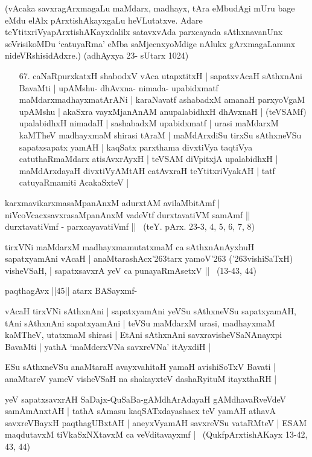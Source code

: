 (vAcaka savxragArxmagaLu maMdarx, madhayx, tAra eMbudAgi mUru bage eMdu elAlx pArxtishAkayxgaLu heVLutatxve. Adare teYtitxriVyapArxtishAKayxdalilx satavxvAda parxcayada sAthxnavanUnx seVrisikoMDu `catuyaRma' eMba saMjecnxyoMdige nAlukx gArxmagaLanunx nideVRshisidAdxre.) (adhAyxya 23- sUtarx 1024)

\begin{itemize}
\item[67.] caNaRpurxkatxH shabodxV vAca utapxtitxH | sapatxvAcaH sAthxnAni BavaMti |
upAMshu- dhAvxna- nimada- upabidxmatf maMdarxmadhayxmatArANi | karaNavatf
ashabadxM amanaH parxyoVgaM upAMshu | akaSxra vayxMjanAnAM anupalabidhxH dhAvxnaH |
(teVSAMf) upalabidhxH nimadaH | sashabadxM upabidxmatf | urasi maMdarxM kaMTheV madhayxmaM shirasi tAraM | maMdArxdiSu tirxSu sAthxneVSu sapatxsapatx yamAH | kaqSatx parxthama divxtiVya taqtiVya catuthaRmaMdarx atisAvxrAyxH | teVSAM diVpitxjA upalabidhxH | maMdArxdayaH divxtiVyAMtAH catAvxraH teYtitxriVyakAH | tatf catuyaRmamiti AcakaSxteV |
\end{itemize}

\begin{shloka}
karxmavikarxmasaMpanAnxM adurxtAM avilaMbitAmf |\\
niVcoVcacxsavxrasaMpanAnxM vadeVtf durxtavatiVM samAmf ||\\
durxtavatiVmf - parxcayavatiVmf || ~(teY. pArx. 23-3, 4, 5, 6, 7, 8)
\end{shloka}

tirxVNi maMdarxM madhayxmamutatxmaM ca sAthxnAnAyxhuH sapatxyamAni vAcaH |
anaMtarashAcx\char'263tarx yamoV\char'263 (\char'263vishiSaTxH) visheVSaH, |
sapatxsavxrA yeV ca punayaRmAsetxV || ~(13-43, 44)


paqthagAvx ||45|| atarx BASayxmf-

vAcaH tirxVNi sAthxnAni | sapatxyamAni yeVSu sAthxneVSu sapatxyamAH, tAni sAthxnAni sapatxyamAni | teVSu maMdarxM urasi, madhayxmaM kaMTheV, utatxmaM shirasi | EtAni sAthxnAni savxravisheVSaNAnayxpi BavaMti | yathA `maMderxVNa savxreVNa' itAyxdiH |

\begin{shloka}
ESu sAthxneVSu anaMtaraH avayxvahitaH yamaH avishiSoTxV Bavati |\\
anaMtareV yameV visheVSaH na shakayxteV dashaRyituM itayxthaRH |
\end{shloka}

yeV sapatxsavxrAH SaDajx-QuSaBa-gAMdhArAdayaH gAMdhavaRveVdeV samAmAnxtAH | tathA sAmasu kaqSATxdayashacx teV yamAH athavA savxreVBayxH paqthagUBxtAH | aneyxVyamAH savxreVSu vataRMteV | ESAM maqdutavxM tiVkaSxNXtavxM ca veVditavayxmf | ~(QukfpArxtishAKayx 13-42, 43, 44)

